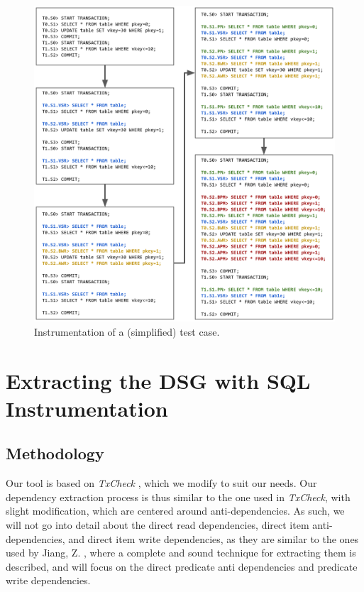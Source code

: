 \begin{figure}[!h]
    \centering
    \includegraphics[width=\linewidth]{assets/sql_instrumentation_sample.png}
    \caption{Instrumentation of a (simplified) test case.}
    \label{fig:sql_instrumentation_sample}
\end{figure}



\section{Extracting the DSG with SQL Instrumentation}

\subsection{Methodology}

Our tool is based on \textit{TxCheck} \cite{jiang2023detecting}, which we modify to suit our needs. Our dependency extraction process is thus similar to the one used in \textit{TxCheck}, with slight modification, which are centered around anti-dependencies. As such, we will not go into detail about the direct read dependencies, direct item anti-dependencies, and direct item write dependencies, as they are similar to the ones used by Jiang, Z. \cite{jiang2023detecting}, where a complete and sound technique for extracting them is described, and will focus on the direct predicate anti dependencies and predicate write dependencies.

